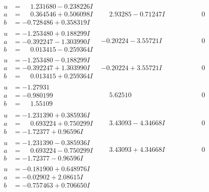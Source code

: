 \documentclass[1p]{elsarticle_modified}
\theoremstyle{definition}
\begin{document}
$$\begin{array}{c|c|c}
\begin{aligned}
u &= \phantom{-}1.231680 - 0.238226 I \\
a &= \phantom{-}0.364546 + 0.506098 I \\
b &= -0.728486 + 0.358319 I\end{aligned}
 & \phantom{-}2.93285 - 0.71247 I & \phantom{-0.000000 } 0 \\ \hline\begin{aligned}
u &= -1.253480 + 0.188299 I \\
a &= -0.392247 - 1.303990 I \\
b &= \phantom{-}0.013415 - 0.259364 I\end{aligned}
 & -0.20224 - 3.55721 I & \phantom{-0.000000 } 0 \\ \hline\begin{aligned}
u &= -1.253480 - 0.188299 I \\
a &= -0.392247 + 1.303990 I \\
b &= \phantom{-}0.013415 + 0.259364 I\end{aligned}
 & -0.20224 + 3.55721 I & \phantom{-0.000000 } 0 \\ \hline\begin{aligned}
u &= -1.27931\phantom{ +0.000000I} \\
a &= -0.980199\phantom{ +0.000000I} \\
b &= \phantom{-}1.55109\phantom{ +0.000000I}\end{aligned}
 & \phantom{-}5.62510\phantom{ +0.000000I} & \phantom{-0.000000 } 0 \\ \hline\begin{aligned}
u &= -1.231390 + 0.385936 I \\
a &= \phantom{-}0.693224 + 0.750299 I \\
b &= -1.72377 + 0.96596 I\end{aligned}
 & \phantom{-}3.43093 - 4.34668 I & \phantom{-0.000000 } 0 \\ \hline\begin{aligned}
u &= -1.231390 - 0.385936 I \\
a &= \phantom{-}0.693224 - 0.750299 I \\
b &= -1.72377 - 0.96596 I\end{aligned}
 & \phantom{-}3.43093 + 4.34668 I & \phantom{-0.000000 } 0 \\ \hline\begin{aligned}
u &= -0.181900 + 0.648976 I \\
a &= -0.02902 + 2.08615 I \\
b &= -0.757463 + 0.706650 I\end{aligned}

\end{array}$$
\end{document}

